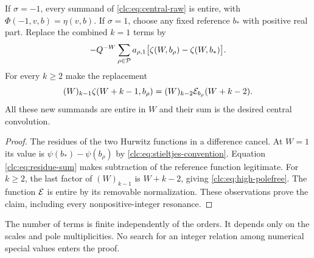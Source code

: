 \begin{corollary}\label{clc:cor:polefree}
If $\sigma=-1$, every summand of \eqref{clc:eq:central-raw} is entire,
with $\Phi(-1,v,b)=\eta(v,b)$. If $\sigma=1$, choose any fixed reference
$b_*$ with positive real part. Replace the combined $k=1$ terms by
\begin{equation}\label{clc:eq:simple-polefree}
 -Q^{-W}\sum_{\rho\in\mathcal P}a_{\rho,1}
 \bigl[\zeta(W,b_\rho)-\zeta(W,b_*)\bigr].
\end{equation}
For every $k\ge2$ make the replacement
\begin{equation}\label{clc:eq:high-polefree}
 (W)_{k-1}\zeta(W+k-1,b_\rho)
 =(W)_{k-2}\mathcal E_{b_\rho}(W+k-2).
\end{equation}
All these new summands are entire in $W$ and their sum is the desired
central convolution.
\end{corollary}
\begin{proof}
The residues of the two Hurwitz functions in a difference cancel. At
$W=1$ its value is $\psi(b_*)-\psi(b_\rho)$ by
\eqref{clc:eq:stieltjes-convention}. Equation
\eqref{clc:eq:residue-sum} makes subtraction of the reference function
legitimate. For $k\ge2$, the last factor of $(W)_{k-1}$ is
$W+k-2$, giving \eqref{clc:eq:high-polefree}. The function $\mathcal E$ is
entire by its removable normalization. These observations prove the
claim, including every nonpositive-integer resonance.
\end{proof}

The number of terms is finite independently of the orders. It depends
only on the scales and pole multiplicities. No search for an integer
relation among numerical special values enters the proof.
